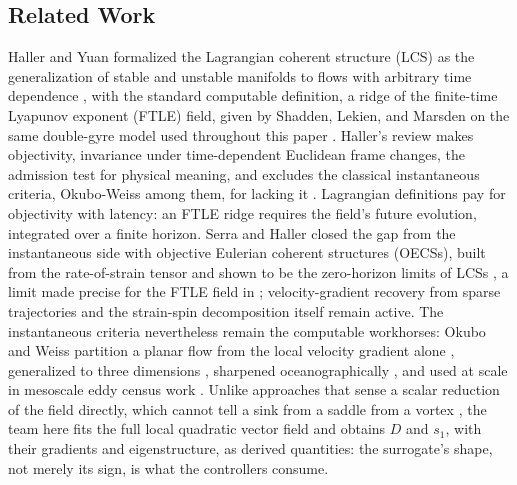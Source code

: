 \documentclass[lettersize,journal]{IEEEtran}
\begin{document}

\subsection{Related Work}
\label{sec:related_robots}

Haller and Yuan formalized the Lagrangian coherent structure (LCS) as
the generalization of stable and unstable manifolds to flows with
arbitrary time dependence \cite{6}, with the standard computable
definition, a ridge of the finite-time Lyapunov exponent (FTLE) field,
given by Shadden, Lekien, and Marsden on the same double-gyre model
used throughout this paper \cite{8}. Haller's review makes objectivity,
invariance under time-dependent Euclidean frame changes, the admission
test for physical meaning, and excludes the classical instantaneous
criteria, Okubo-Weiss among them, for lacking it \cite{16}. Lagrangian
definitions pay for objectivity with latency: an FTLE ridge requires
the field's future evolution, integrated over a finite horizon. Serra
and Haller closed the gap from the instantaneous side with objective
Eulerian coherent structures (OECSs), built from the rate-of-strain
tensor and shown to be the zero-horizon limits of LCSs \cite{17}, a
limit made precise for the FTLE field in \cite{18}; velocity-gradient
recovery from sparse trajectories \cite{19} and the strain-spin
decomposition itself \cite{20} remain active. The instantaneous
criteria nevertheless remain the computable workhorses: Okubo and Weiss
partition a planar flow from the local velocity gradient alone
\cite{21,22}, generalized to three dimensions \cite{23}, sharpened
oceanographically \cite{24}, and used at scale in mesoscale eddy census
work \cite{5}. Unlike approaches that sense a scalar reduction of the
field directly, which cannot tell a sink from a saddle from a vortex
\cite{25}, the team here fits the full local quadratic vector field and
obtains $D$ and $s_1$, with their gradients and eigenstructure, as
derived quantities: the surrogate's shape, not merely its sign, is what
the controllers consume.
\end{document}

